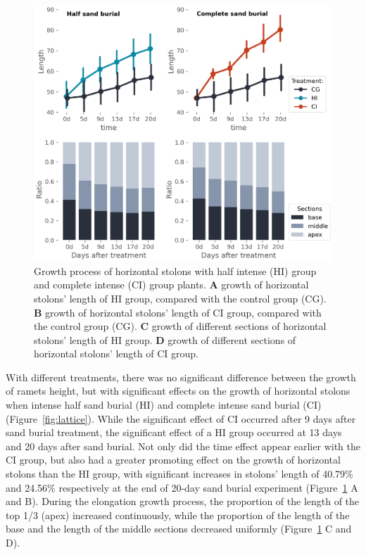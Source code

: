 \documentclass[]{interact}
\theoremstyle{plain}%
\theoremstyle{definition}
\theoremstyle{remark}
\begin{document}
\begin{figure}[!h]
  \centering
  \includegraphics[scale=0.8]{../figs/growth_process.jpg}
  \caption{
    Growth process of horizontal stolons with half intense (HI) group and complete intense (CI) group plants.
    \textbf{A} growth of horizontal stolons' length of HI group, compared with the control group (CG).
    \textbf{B} growth of horizontal stolons' length of CI group, compared with the control group (CG).
    \textbf{C} growth of different sections of horizontal stolons' length of HI group.
    \textbf{D} growth of different sections of horizontal stolons' length of CI group.
  }
  \label{fig:growth}
\end{figure}

With different treatments, there was no significant difference between the growth of ramets height, but with significant effects on the growth of horizontal stolons when intense half sand burial (HI) and complete intense sand burial (CI) (Figure~\ref{fig:lattice}).
While the significant effect of CI occurred after 9 days after sand burial treatment, the significant effect of a HI group occurred at 13 days and 20 days after sand burial. 
Not only did the time effect appear earlier with the CI group, but also had a greater promoting effect on the growth of horizontal stolons than the HI group, with significant increases in stolons' length of 40.79\% and 24.56\% respectively at the end of 20-day sand burial experiment (Figure~\ref{fig:growth} A and B).
During the elongation growth process, the proportion of the length of the top 1/3 (apex) increased continuously, while the proportion of the length of the base and the length of the middle sections decreased uniformly (Figure~\ref{fig:growth} C and D).
\end{document}
